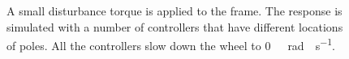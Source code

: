 \begin{figure}[H]
\begin{minipage}{\linewidth}
{		}
		\caption{A small disturbance torque is applied to the frame. The response is simulated with a number of controllers that have different locations of poles. All the controllers slow down the wheel to \si{0\ rad \cdot s^{-1}}.}
		\label{disturbanceStateSpaceFrameAndWheel}
	\end{minipage}
\end{figure}\vspace{-18pt}
%
